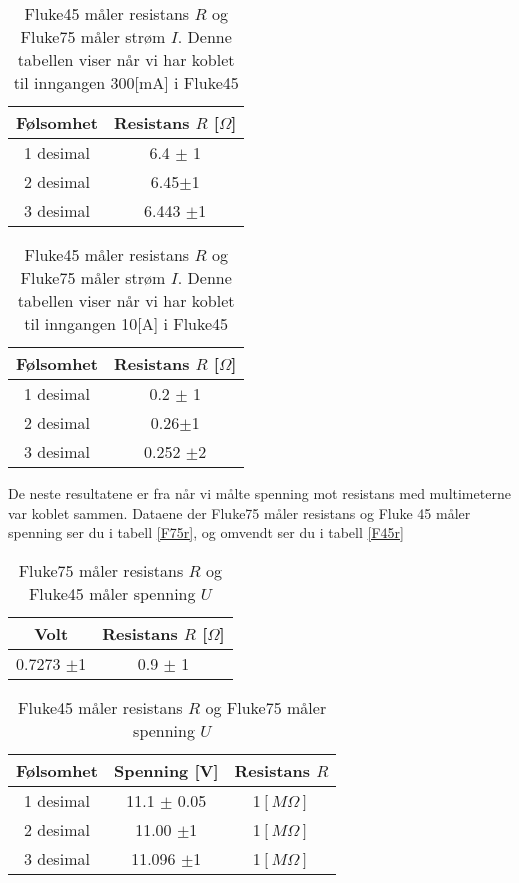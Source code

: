 \documentclass[norsk,a4paper,12pt]{article}
\begin{document}
\begin{table}[h!]
 	 \centering
 	 \caption[Følsomhet i F45 med 300mA ]{Fluke45 måler resistans $R$ og Fluke75 måler strøm $I$. Denne tabellen viser når vi har koblet til inngangen 300[mA] i Fluke45}
  		\begin{tabular}{|c|c|} \hline
  		\textbf{Følsomhet} &\textbf{Resistans $R$ [$\Omega$]} \\ \hline
  		1 desimal & 6.4  $\pm$ 1\\
  		2 desimal & 6.45$\pm$1 \\
		3 desimal &  6.443 $\pm$1\\ \hline
  		\end{tabular}
	\label{300mA}
\end{table}
\begin{table}[h!]
 	 \centering
 	 \caption[Følsomhet i F45 med 10A ]{Fluke45 måler resistans $R$ og Fluke75 måler strøm $I$. Denne tabellen viser når vi har koblet til inngangen 10[A] i Fluke45}
  		\begin{tabular}{|c|c|} \hline
  		\textbf{Følsomhet} &\textbf{Resistans $R$ [$\Omega$]} \\ \hline
  		1 desimal & 0.2  $\pm$ 1\\
  		2 desimal & 0.26$\pm$1 \\
		3 desimal &  0.252 $\pm$2\\ \hline
  		\end{tabular}
	\label{10A}
\end{table}

De neste resultatene er fra når vi målte spenning mot resistans med multimeterne var koblet sammen. Dataene der Fluke75 måler resistans og Fluke 45 måler spenning ser du i tabell \vref{F75r}, og omvendt ser du i tabell \vref{F45r}

\begin{table}[h!]
 	 \centering
 	 \caption[F45 - spenning vs F75 - resistans ]{Fluke75 måler resistans $R$ og Fluke45 måler spenning $U$}
  		\begin{tabular}{|c|c|} \hline
  		\textbf{Volt} &\textbf{Resistans $R$ [$\Omega$]} \\ \hline
  		0.7273 $\pm$1 & 0.9  $\pm$ 1\\ \hline
  		\end{tabular}
	\label{F75r}
\end{table}
\begin{table}[h!]
 	 \centering
 	 \caption[F75 - spenning vs F45 - resistans  ]{Fluke45 måler resistans $R$ og Fluke75 måler spenning $U$}
  		\begin{tabular}{|c|c|c|} \hline
  		\textbf{Følsomhet} &\textbf{Spenning [V]} &\textbf{Resistans $R$} \\ \hline
  		1 desimal & 11.1 $\pm$ 0.05 &1$[M\Omega]$\\
  		2 desimal & 11.00 $\pm$1 &1$[M\Omega]$ \\
		3 desimal & 11.096 $\pm$1 &1$[M\Omega]$ \\ \hline
  		\end{tabular}
	\label{F45r}
\end{table}
\end{document}
